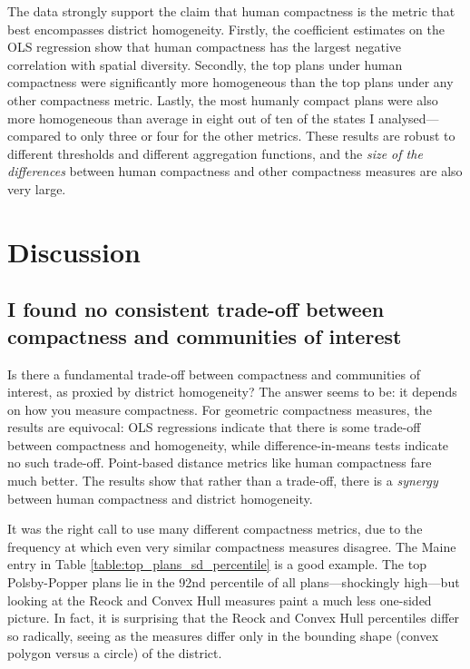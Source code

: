 \documentclass[]{article}
\begin{document}
The data strongly support the claim that human compactness is the metric
that best encompasses district homogeneity. Firstly, the coefficient
estimates on the OLS regression show that human compactness has the
largest negative correlation with spatial diversity. Secondly, the top
plans under human compactness were significantly more homogeneous than
the top plans under any other compactness metric. Lastly, the most
humanly compact plans were also more homogeneous than average in eight
out of ten of the states I analysed---compared to only three or four for
the other metrics. These results are robust to different thresholds and
different aggregation functions, and the \emph{size of the differences}
between human compactness and other compactness measures are also very
large.

\hypertarget{discussion}{%
\section{Discussion}\label{discussion}}

\hypertarget{i-found-no-consistent-trade-off-between-compactness-and-communities-of-interest}{%
\subsection{I found no consistent trade-off between compactness and
communities of
interest}\label{i-found-no-consistent-trade-off-between-compactness-and-communities-of-interest}}

Is there a fundamental trade-off between compactness and communities of
interest, as proxied by district homogeneity? The answer seems to be: it
depends on how you measure compactness. For geometric compactness
measures, the results are equivocal: OLS regressions indicate that there
is some trade-off between compactness and homogeneity, while
difference-in-means tests indicate no such trade-off. Point-based
distance metrics like human compactness fare much better. The results
show that rather than a trade-off, there is a \emph{synergy} between
human compactness and district homogeneity.

It was the right call to use many different compactness metrics, due to
the frequency at which even very similar compactness measures disagree.
The Maine entry in Table \ref{table:top_plans_sd_percentile} is a good
example. The top Polsby-Popper plans lie in the 92nd percentile of all
plans---shockingly high---but looking at the Reock and Convex Hull
measures paint a much less one-sided picture. In fact, it is surprising
that the Reock and Convex Hull percentiles differ so radically, seeing
as the measures differ only in the bounding shape (convex polygon versus
a circle) of the district.
\end{document}
